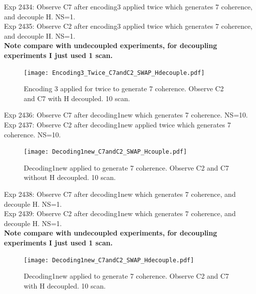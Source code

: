 \clearpage
Exp 2434: Observe C7 after encoding3 applied twice which generates 7 coherence, and decouple H. NS=1.\\
Exp 2435: Observe C2 after encoding3 applied twice which generates 7 coherence, and decouple H. NS=1.\\
\textbf{Note compare with undecoupled experiments, for decoupling experiments I just used 1 scan.}

\begin{figure}[htb]
\begin{center}
\texttt{[image: Encoding3\_Twice\_C7andC2\_SWAP\_Hdecouple.pdf]}
\end{center}
\setlength{\abovecaptionskip}{-0.35cm}
\caption{\footnotesize{Encoding 3 applied for twice to generate 7 coherence. Observe C2 and C7 with H decoupled. 10 scan.}}\label{2434and2435}
\end{figure}

\clearpage
Exp 2436: Observe C7 after decoding1new which generates 7 coherence. NS=10.\\
Exp 2437: Observe C2 after decoding1new applied twice which generates 7 coherence. NS=10.\\

\begin{figure}[htb]
\begin{center}
\texttt{[image: Decoding1new\_C7andC2\_SWAP\_Hcouple.pdf]}
\end{center}
\setlength{\abovecaptionskip}{-0.35cm}
\caption{\footnotesize{Decoding1new applied to generate 7 coherence. Observe C2 and C7 without H decoupled. 10 scan.}}\label{2436and2437}
\end{figure}

\clearpage
Exp 2438: Observe C7 after decoding1new which generates 7 coherence, and decouple H. NS=1.\\
Exp 2439: Observe C2 after decoding1new which generates 7 coherence, and decouple H. NS=1.\\
\textbf{Note compare with undecoupled experiments, for decoupling experiments I just used 1 scan.}

\begin{figure}[htb]
\begin{center}
\texttt{[image: Decoding1new\_C7andC2\_SWAP\_Hdecouple.pdf]}
\end{center}
\setlength{\abovecaptionskip}{-0.35cm}
\caption{\footnotesize{Decoding1new applied to generate 7 coherence. Observe C2 and C7 with H decoupled. 10 scan.}}\label{2438and2439}
\end{figure}

